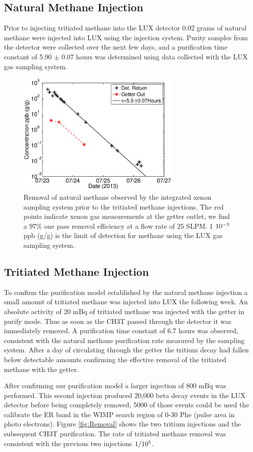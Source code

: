 \subsection{Natural Methane Injection}

Prior to injecting tritiated methane into the LUX detector 0.02 grams of natural methane were injected into LUX using the injection system.  Purity samples from the detector were collected over the next few days, and a purification time constant of 5.90 $\pm$ 0.07 hours was determined using data collected with the LUX gas sampling system.



\begin{figure}[h!]\centering
\includegraphics[width=80mm]{CH4_injection_3.eps}
\caption{Removal of natural methane observed by the integrated xenon sampling system prior to the tritiated methane injections. The red points indicate xenon gas measurements at the getter outlet, we find a 97\% one pass removal efficiency at a flow rate of 25 SLPM. 1 $\rm 10^{-3}$ ppb (g/g) is the limit of detection for methane using the LUX gas sampling system.}
\label{fig:Removal_methane}
\end{figure}


\subsection{Tritiated Methane Injection}

To confirm the purification model established by the natural methane injection a small amount of tritiated methane was injected into LUX the following week. An absolute activity of 20 mBq of tritiated methane was injected with the getter in purify mode.  Thus as soon as the CH3T passed through the detector it was immediately removed.  A purification time constant of 6.7 hours was observed, consistent with the natural methane purification rate measured by the sampling system. After a day of circulating through the getter the tritium decay had fallen below detectable amounts confirming the effective removal of the tritiated methane with the getter. 

After confirming our purification model a larger injection of 800 mBq was performed. This second injection produced 20,000 beta decay events in the LUX detector before being completely removed, 5000 of those events could be used the calibrate the ER band in the WIMP search region of 0-30 Phe (pulse area in photo electrons). 
Figure \ref{fig:Removal} shows the two tritium injections and the subsequent CH3T purification. The rate of tritiated methane removal was consistent with the previous two injections $\rm 1/10^5$.
